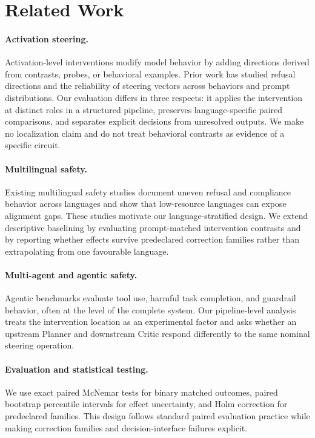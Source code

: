 \section{Related Work}
\paragraph{Activation steering.} Activation-level interventions modify model behavior by adding directions derived from contrasts, probes, or behavioral examples. Prior work has studied refusal directions and the reliability of steering vectors across behaviors and prompt distributions. Our evaluation differs in three respects: it applies the intervention at distinct roles in a structured pipeline, preserves language-specific paired comparisons, and separates explicit decisions from unresolved outputs. We make no localization claim and do not treat behavioral contrasts as evidence of a specific circuit.

\paragraph{Multilingual safety.} Existing multilingual safety studies document uneven refusal and compliance behavior across languages and show that low-resource languages can expose alignment gaps. These studies motivate our language-stratified design. We extend descriptive baselining by evaluating prompt-matched intervention contrasts and by reporting whether effects survive predeclared correction families rather than extrapolating from one favourable language.

\paragraph{Multi-agent and agentic safety.} Agentic benchmarks evaluate tool use, harmful task completion, and guardrail behavior, often at the level of the complete system. Our pipeline-level analysis treats the intervention location as an experimental factor and asks whether an upstream Planner and downstream Critic respond differently to the same nominal steering operation.

\paragraph{Evaluation and statistical testing.} We use exact paired McNemar tests for binary matched outcomes, paired bootstrap percentile intervals for effect uncertainty, and Holm correction for predeclared families. This design follows standard paired evaluation practice while making correction families and decision-interface failures explicit.